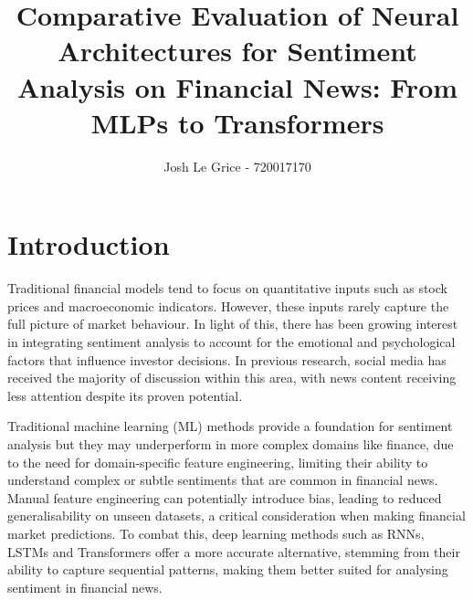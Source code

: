 \documentclass[english]{article}
\begin{document}

\title{\bf Comparative Evaluation of Neural Architectures for Sentiment Analysis on Financial News: From MLPs to Transformers}

\vspace{-5em}

\author{Josh Le Grice - 720017170}
\date{}
\maketitle
\thispagestyle{fancy}
\vspace{-6em}


\section{Introduction}

\vspace{-0.5em}

Traditional financial models tend to focus on quantitative inputs such as stock prices and macroeconomic indicators.
However, these inputs rarely capture the full picture of market behaviour\cite{Atkins2018-tq}.
In light of this, there has been growing interest in integrating sentiment analysis to account for the emotional and 
psychological factors that influence investor decisions\cite{Atkins2018-tq}. In previous research, 
social media has received the majority of discussion within this area, with 
news content receiving less attention despite its proven potential\cite{Ashtiani2023-su}.

Traditional machine learning (ML) methods provide a foundation for sentiment analysis but they may underperform in more complex 
domains like finance, due to the need for domain-specific feature engineering, limiting their ability to understand complex or subtle sentiments that 
are common in financial news\cite{Bashiri2024-hw}.
Manual feature engineering can potentially introduce bias, leading to reduced generalisability on unseen datasets, a critical consideration when making
financial market predictions. To combat this, deep learning methods such as RNNs, LSTMs and Transformers offer a more accurate alternative, stemming from their ability 
to capture sequential patterns, making them better suited for analysing sentiment in financial news\cite{Bashiri2024-hw}.
\end{document}
